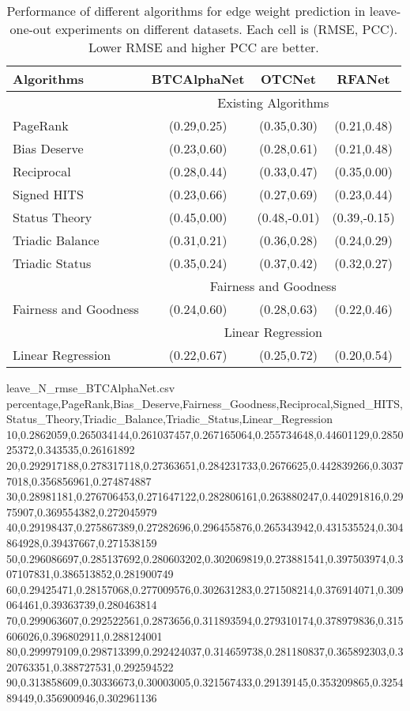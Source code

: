 \begin{table}[htbp]
\centering
\captionsetup{justification=centering,margin=1.8cm}
\caption{Performance of different algorithms for edge weight prediction in leave-one-out experiments on different datasets. Each cell is (RMSE, PCC). Lower RMSE and higher PCC are better.}
	\begin{tabular}{l||c|c|c}
	\toprule
	\textbf{Algorithms}& \textbf{BTCAlphaNet} & \textbf{OTCNet} & \textbf{RFANet}\\ \hline
	& \multicolumn{3}{c}{Existing Algorithms} \\ \hline
	PageRank           & (0.29,0.25) & (0.35,0.30) & (0.21,0.48)\\ \hline
	Bias Deserve      & (0.23,0.60) & (0.28,0.61) & (0.21,0.48)\\ \hline
	Reciprocal         & (0.28,0.44) & (0.33,0.47) & (0.35,0.00)\\ \hline
	Signed HITS       & (0.23,0.66) & (0.27,0.69) & (0.23,0.44)\\ \hline
	Status Theory     & (0.45,0.00) & (0.48,-0.01)& (0.39,-0.15)\\ \hline
	Triadic Balance   & (0.31,0.21) & (0.36,0.28) & (0.24,0.29)\\ \hline
	Triadic Status    & (0.35,0.24) & (0.37,0.42) & (0.32,0.27)\\ \hline
	& \multicolumn{3}{c}{Fairness and Goodness} \\ \hline
	Fairness and Goodness & (0.24,0.60) & (0.28,0.63) & (0.22,0.46)\\ \hline
	& \multicolumn{3}{c}{Linear Regression} \\ \hline
	Linear Regression & (0.22,0.67) & (0.25,0.72) & (0.20,0.54)\\ \hline
	\end{tabular}
	\label{table1}
\end{table}



\begin{filecontents*}{leave_N_rmse_BTCAlphaNet.csv}
percentage,PageRank,Bias_Deserve,Fairness_Goodness,Reciprocal,Signed_HITS,Status_Theory,Triadic_Balance,Triadic_Status,Linear_Regression
10,0.2862059,0.265034144,0.261037457,0.267165064,0.255734648,0.44601129,0.285025372,0.343535,0.26161892
20,0.292917188,0.278317118,0.27363651,0.284231733,0.2676625,0.442839266,0.30377018,0.356856961,0.274874887
30,0.28981181,0.276706453,0.271647122,0.282806161,0.263880247,0.440291816,0.2975907,0.369554382,0.272045979
40,0.29198437,0.275867389,0.27282696,0.296455876,0.265343942,0.431535524,0.304864928,0.39437667,0.271538159
50,0.296086697,0.285137692,0.280603202,0.302069819,0.273881541,0.397503974,0.307107831,0.386513852,0.281900749
60,0.29425471,0.28157068,0.277009576,0.302631283,0.271508214,0.376914071,0.309064461,0.39363739,0.280463814
70,0.299063607,0.292522561,0.2873656,0.311893594,0.279310174,0.378979836,0.315606026,0.396802911,0.288124001
80,0.299979109,0.298713399,0.292424037,0.314659738,0.281180837,0.365892303,0.320763351,0.388727531,0.292594522
90,0.313858609,0.30336673,0.30003005,0.321567433,0.29139145,0.353209865,0.325489449,0.356900946,0.302961136
\end{filecontents*}


